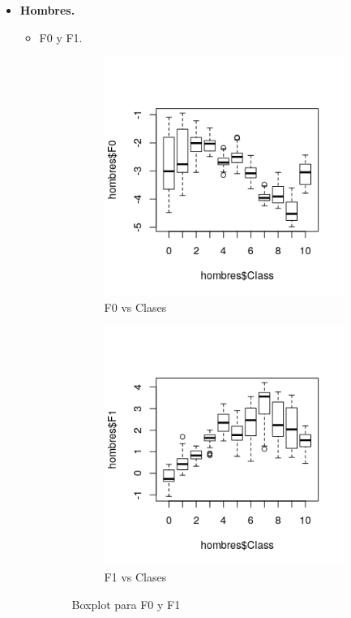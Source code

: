 \begin{itemize}
	\item \textbf{Hombres.}
	\begin{itemize}
		\item F0 y F1.
		
		\begin{figure}[H]
			\centering
			\begin{subfigure}{.5\textwidth}
				\centering
				\includegraphics[width=.9\linewidth]{bphF0.png}
				\caption{F0 vs Clases}
				\label{fig:bphF0}
			\end{subfigure}%
			\begin{subfigure}{.5\textwidth}
				\centering
				\includegraphics[width=.9\linewidth]{bphF1.png}
				\caption{F1 vs Clases}
				\label{fig:bphF1}
			\end{subfigure}
			\caption{Boxplot para F0 y F1}
			\label{fig:bph01}
		\end{figure}
	

\end{itemize}
\end{itemize}
